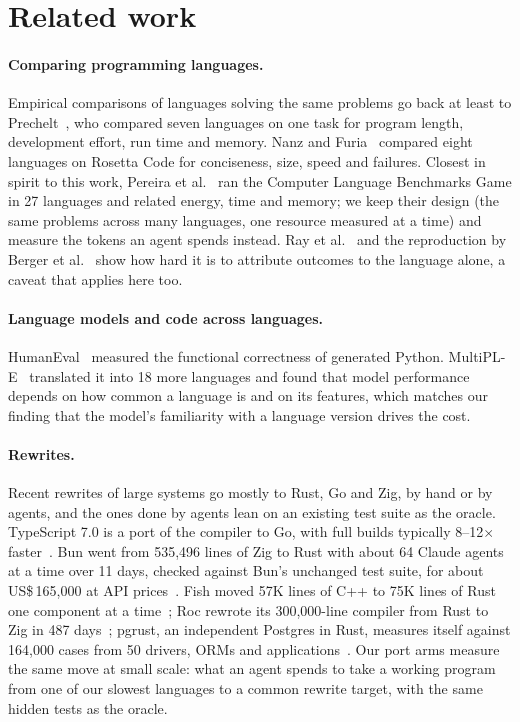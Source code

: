 \documentclass[11pt,a4paper]{article}
\begin{document}
\section{Related work}

\paragraph{Comparing programming languages.} Empirical comparisons of languages solving the same
problems go back at least to Prechelt~\cite{prechelt2000}, who compared seven languages on one task for
program length, development effort, run time and memory. Nanz and Furia~\cite{nanz2015} compared eight
languages on Rosetta Code for conciseness, size, speed and failures. Closest in spirit to this work,
Pereira et al.~\cite{pereira2017,pereira2021} ran the Computer Language Benchmarks Game in 27 languages
and related energy, time and memory; we keep their design (the same problems across many languages, one
resource measured at a time) and measure the tokens an agent spends instead. Ray et
al.~\cite{ray2014} and the reproduction by Berger et al.~\cite{berger2019} show how hard it is to
attribute outcomes to the language alone, a caveat that applies here too.

\paragraph{Language models and code across languages.} HumanEval~\cite{humaneval} measured the
functional correctness of generated Python. MultiPL-E~\cite{multiple} translated it into 18 more
languages and found that model performance depends on how common a language is and on its features,
which matches our finding that the model's familiarity with a language version drives the cost.

\paragraph{Rewrites.} Recent rewrites of large systems go mostly to Rust, Go and Zig, by hand or by
agents, and the ones done by agents lean on an existing test suite as the oracle. TypeScript 7.0 is a port
of the compiler to Go, with full builds typically 8--12$\times$ faster~\cite{ts7}. Bun went from 535,496
lines of Zig to Rust with about 64 Claude agents at a time over 11 days, checked against Bun's unchanged
test suite, for about US\$\,165,000 at API prices~\cite{bunrust}. Fish moved 57K lines of C++ to 75K lines
of Rust one component at a time~\cite{fishrust}; Roc rewrote its 300,000-line compiler from Rust to Zig in
487 days~\cite{roczig}; pgrust, an independent Postgres in Rust, measures itself against 164,000 cases from
50 drivers, ORMs and applications~\cite{pgrust}. Our port arms measure the same move at small scale: what
an agent spends to take a working program from one of our slowest languages to a common rewrite target,
with the same hidden tests as the oracle.
\end{document}
